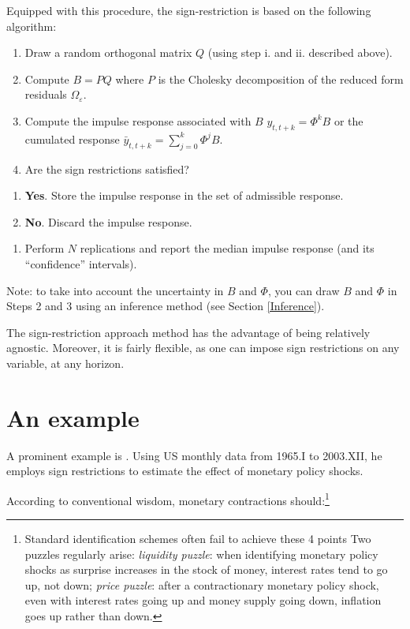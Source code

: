 \documentclass[
  12pt,
]{book}
\providecommand{\tightlist}{%
  \setlength{\itemsep}{0pt}\setlength{\parskip}{0pt}}
\theoremstyle{definition}
\theoremstyle{definition}
\theoremstyle{definition}
\theoremstyle{definition}
\theoremstyle{remark}
\begin{document}
Equipped with this procedure, the sign-restriction is based on the following algorithm:

\begin{enumerate}
\def\labelenumi{\arabic{enumi}.}
\tightlist
\item
  Draw a random orthogonal matrix \(Q\) (using step i. and ii. described above).
\item
  Compute \(B = PQ\) where \(P\) is the Cholesky decomposition of the reduced form residuals \(\Omega_{\varepsilon}\).
\item
  Compute the impulse response associated with \(B\) \(y_{t,t+k}=\Phi^kB\) or the cumulated response \(\bar y_{t,t+k}=\sum_{j=0}^{k}\Phi^jB\).
\item
  Are the sign restrictions satisfied?
\end{enumerate}

\begin{enumerate}
\def\labelenumi{\alph{enumi}.}
\tightlist
\item
  \textbf{Yes}. Store the impulse response in the set of admissible response.
\item
  \textbf{No}. Discard the impulse response.
\end{enumerate}

\begin{enumerate}
\def\labelenumi{\arabic{enumi}.}
\setcounter{enumi}{4}
\tightlist
\item
  Perform \(N\) replications and report the median impulse response (and its ``confidence'' intervals).
\end{enumerate}

Note: to take into account the uncertainty in \(B\) and \(\Phi\), you can draw \(B\) and \(\Phi\) in Steps 2 and 3 using an inference method (see Section \ref{Inference}).

The sign-restriction approach method has the advantage of being relatively agnostic. Moreover, it is fairly flexible, as one can impose sign restrictions on any variable, at any horizon.

\hypertarget{an-example}{%
\section{An example}\label{an-example}}

A prominent example is \citet{Uhlig_2005}. Using US monthly data from 1965.I to 2003.XII, he employs sign restrictions to estimate the effect of monetary policy shocks.

According to conventional wisdom, monetary contractions should:\footnote{Standard identification schemes often fail to achieve these 4 points Two puzzles regularly arise: \emph{liquidity puzzle}: when identifying monetary policy shocks as surprise increases in the stock of money, interest rates tend to go up, not down; \emph{price puzzle}: after a contractionary monetary policy shock, even with interest rates going up and money supply going down, inflation goes up rather than down.}
\end{document}
